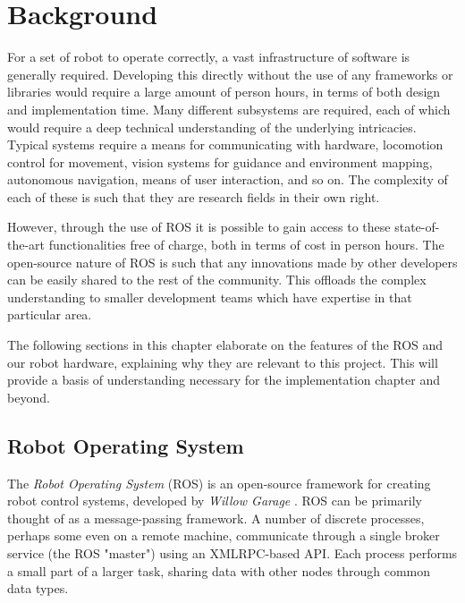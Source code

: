 \chapter{Background}
\label{chap:background}

For a set of robot to operate correctly, a vast infrastructure of software is generally required. Developing this directly without the use of any frameworks or libraries would require a large amount of person hours, in terms of both design and implementation time. Many different subsystems are required, each of which would require a deep technical understanding of the underlying intricacies. Typical systems require a means for communicating with hardware, locomotion control for movement, vision systems for guidance and environment mapping, autonomous navigation, means of user interaction, and so on. The complexity of each of these is such that they are research fields in their own right. 

However, through the use of ROS it is possible to gain access to these state-of-the-art functionalities free of charge, both in terms of cost in person hours. The open-source nature of ROS is such that any innovations made by other developers can be easily shared to the rest of the community. This offloads the complex understanding to smaller development teams which have expertise in that particular area.

The following sections in this chapter elaborate on the features of the ROS and our robot hardware, explaining why they are relevant to this project. This will provide a basis of understanding necessary for the implementation chapter and beyond.


\section{Robot Operating System}

The \emph{Robot Operating System} (ROS) is an open-source framework for creating robot control systems, developed by \emph{Willow Garage} \cite{ros_paper}. ROS can be primarily thought of as a message-passing framework. A number of discrete processes, perhaps some even on a remote machine, communicate through a single broker service (the ROS "master") using an XMLRPC-based API. Each process performs a small part of a larger task, sharing data with other nodes through common data types.


